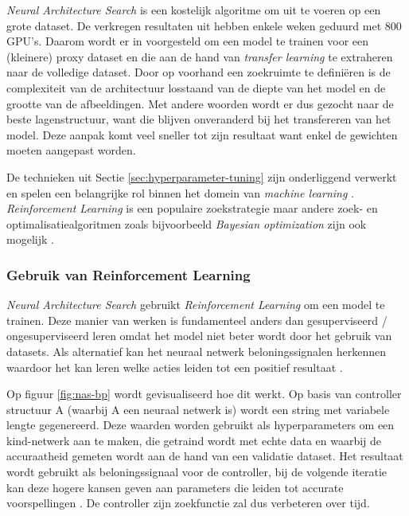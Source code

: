 \textit{Neural Architecture Search} is een kostelijk algoritme om uit te voeren op een grote dataset. De verkregen resultaten uit \textcite{ZophL2016} hebben enkele weken geduurd met 800 GPU's. Daarom wordt er in \textcite{Zoph2017} voorgesteld om een model te trainen voor een (kleinere) proxy dataset en die aan de hand van \textit{transfer learning} te extraheren naar de volledige dataset. Door op voorhand een zoekruimte te definiëren is de complexiteit van de architectuur losstaand van de diepte van het model en de grootte van de afbeeldingen. Met andere woorden wordt er dus gezocht naar de beste lagenstructuur, want die blijven onveranderd bij het transfereren van het model. Deze aanpak komt veel sneller tot zijn resultaat want enkel de gewichten moeten aangepast worden.

De technieken uit Sectie \ref{sec:hyperparameter-tuning} zijn onderliggend verwerkt en spelen een belangrijke rol binnen het domein van \textit{machine learning} \autocite{ZophL2016}. \textit{Reinforcement Learning} is een populaire zoekstrategie maar andere zoek- en optimalisatiealgoritmen zoals bijvoorbeeld \textit{Bayesian optimization} zijn ook mogelijk \autocite{Elsken2019}.

\subsubsection{Gebruik van Reinforcement Learning}
\label{subsubsec:nas-reinforcement}

\textit{Neural Architecture Search} gebruikt \textit{Reinforcement Learning} om een model te trainen. Deze manier van werken is fundamenteel anders dan gesuperviseerd / ongesuperviseerd leren omdat het model niet beter wordt door het gebruik van datasets. Als alternatief kan het neuraal netwerk beloningssignalen herkennen waardoor het kan leren welke acties leiden tot een positief resultaat \autocite{Lievens2019}.

Op figuur \ref{fig:nas-bp} wordt gevisualiseerd hoe dit werkt. Op basis van controller structuur A (waarbij A een neuraal netwerk is) wordt een string met variabele lengte gegenereerd. Deze waarden worden gebruikt als hyperparameters om een kind-netwerk aan te maken, die getraind wordt met echte data en waarbij de accuraatheid gemeten wordt aan de hand van een validatie dataset. Het resultaat wordt gebruikt als beloningssignaal voor de controller, bij de volgende iteratie kan deze hogere kansen geven aan parameters die leiden tot accurate voorspellingen \autocite{ZophL2016}. De controller zijn zoekfunctie zal dus verbeteren over tijd.

